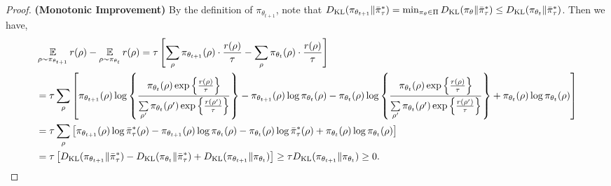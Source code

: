 \begin{proof}
	{\bf (Monotonic Improvement)} By the definition of $\pi_{\theta_{t+1}}$, note that $D_{\mathrm{KL}}(\pi_{\theta_{t+1}} \| \bar{\pi}_\tau^*)  = \min_{\pi_\theta \in \Pi}{ D_{\mathrm{KL}}(\pi_\theta \| \bar{\pi}_\tau^*)} \leq D_{\mathrm{KL}}(\pi_{\theta_{t}} \| \bar{\pi}_\tau^*)$. Then we have,
	{\small
	\begin{equation*}
	\begin{split}
		&\operatorname*{\mathbb{E}}_{\rho \sim \pi_{\theta_{t+1}}}{  r(\rho)} - \operatorname*{\mathbb{E}}_{\rho \sim \pi_{\theta_{t}}}{  r(\rho)} = \tau \left[ \sum\limits_{\rho}{\pi_{\theta_{t+1}}(\rho) \cdot \frac{r(\rho)}{\tau}} - \sum\limits_{\rho}{\pi_{\theta_{t}}(\rho) \cdot \frac{r(\rho)}{\tau}} \right] \\
		&= \tau \sum\limits_{\rho}{\left[ \pi_{\theta_{t+1}}(\rho) \log\left\{ \frac{ \pi_{\theta_{t}}(\rho) \exp\left\{\frac{r(\rho)}{\tau}\right\} }{ \sum\limits_{\rho^\prime}{ \pi_{\theta_{t}}(\rho^\prime) \exp\left\{\frac{r(\rho^\prime)}{\tau}\right\} } } \right\} - \pi_{\theta_{t+1}}(\rho) \log{ \pi_{\theta_{t}}(\rho)} - \pi_{\theta_{t}}(\rho) \log\left\{ \frac{ \pi_{\theta_{t}}(\rho) \exp\left\{\frac{r(\rho)}{\tau}\right\} }{ \sum\limits_{\rho^\prime}{ \pi_{\theta_{t}}(\rho^\prime) \exp\left\{\frac{r(\rho^\prime)}{\tau}\right\} } } \right\} + \pi_{\theta_{t}}(\rho) \log{ \pi_{\theta_{t}}(\rho) } \right]} \\
		&= \tau \sum\limits_{\rho}{\left[ \pi_{\theta_{t+1}}(\rho) \log{ \bar{\pi}_\tau^*(\rho) } - \pi_{\theta_{t+1}}(\rho) \log{ \pi_{\theta_{t}}(\rho)} - \pi_{\theta_{t}}(\rho) \log{ \bar{\pi}_\tau^*(\rho) } + \pi_{\theta_{t}}(\rho) \log{ \pi_{\theta_{t}}(\rho) } \right]} \\
		&= \tau \left[ D_{\mathrm{KL}}(\pi_{\theta_{t+1}} \Vert \bar{\pi}_\tau^*) - D_{\mathrm{KL}}(\pi_{\theta_{t}} \Vert \bar{\pi}_\tau^*) + D_{\mathrm{KL}}(\pi_{\theta_{t+1}} \| \pi_{\theta_{t}}) \right] \ge \tau D_{\mathrm{KL}}(\pi_{\theta_{t+1}} \| \pi_{\theta_{t}}) \ge 0.
	\end{split}
	\end{equation*}
	}
	

\end{proof}
